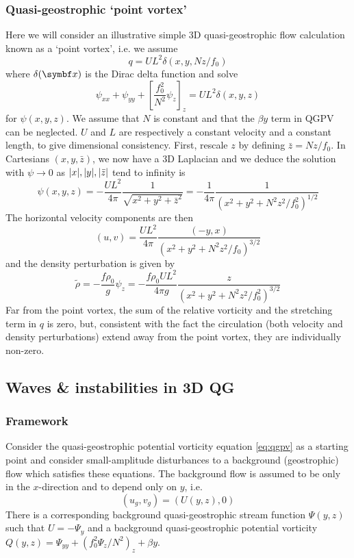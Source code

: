 \documentclass{jknotes}
\begin{document}
\subsubsection{Quasi-geostrophic `point vortex'}
Here we will consider an illustrative simple 3D quasi-geostrophic flow
calculation known as a `point vortex', i.e. we assume
\begin{equation}
	q = U L^2 \delta(x,y, Nz/f_0)
\end{equation}
where $\delta(\x)$ is the Dirac delta function and solve
\begin{equation}
	\psi_{xx} + \psi_{yy} + \left[ \frac{f_0^2}{N^2} \psi_z\right]_z = UL^2
	\delta(x,y,z)
\end{equation}
for $\psi(x,y,z)$. We assume that $N$ is constant and that the $\beta y$ term
in QGPV can be neglected. $U$ and $L$ are respectively a constant velocity and
a constant length, to give dimensional consistency. First, rescale $z$ by
defining $\bar{z} = Nz/f_0$. In Cartesians $(x,y,\bar{z})$, we now have a 3D
Laplacian and we deduce the solution with $\psi \to 0$ as $\abs{x}, \abs{y},
\abs{\bar{z}}$ tend to infinity is
\begin{equation}
	\psi(x,y,z) = -\frac{UL^2}{4\pi} \frac{1}{\sqrt{x^2+y^2+\bar{z}^2}} =
	-\frac{1}{4\pi} \frac{1}{(x^2+y^2+N^2z^2/f_0^2)^{1/2}}
\end{equation}
The horizontal velocity components are then
\begin{equation}
	(u,v) = \frac{UL^2}{4\pi} \frac{(-y,x)}{(x^2+y^2+N^2z^2/f_0)^{3/2}}
\end{equation}
and the density perturbation is given by
\begin{equation}
	\tilde{\rho} = -\frac{f \rho_0}{g} \psi_z = -\frac{f \rho_0 U L^2}{4\pi g}
	\frac{z}{(x^2+y^2+N^2z^2/f_0^2)^{3/2}}
\end{equation}
Far from the point vortex, the sum of the relative vorticity and the
stretching term in $q$ is zero, but, consistent with the fact the circulation
(both velocity and density perturbations) extend away from the point vortex,
they are individually non-zero.

\subsection{Waves \& instabilities in 3D QG}
\label{ss:3dqg}
\subsubsection{Framework}
Consider the quasi-geostrophic potential vorticity equation \eqref{eq:qgpv} as
a starting point and consider small-amplitude disturbances to a background
(geostrophic) flow which satisfies these equations. The background flow is
assumed to be only in the $x$-direction and to depend only on $y$, i.e.
\begin{equation}
	(u_g,v_g) = (U(y,z), 0)
\end{equation}
There is a corresponding background quasi-geostrophic stream function
$\Psi(y,z)$ such that $U = -\Psi_y$ and a background quasi-geostrophic
potential vorticity $Q(y,z) = \Psi_{yy} + (f_0^2\Psi_z/N^2)_z + \beta y$.
\end{document}
